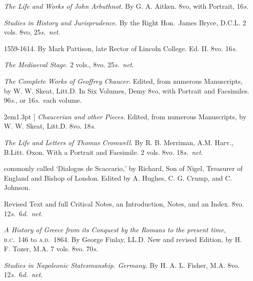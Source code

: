 \documentclass[12pt,oneside]{book}[2021/10/04]
\newcommand{\longdash}{\rule[.5ex]{2em}{1.3pt}
}
\newenvironment{advlist}{
  \begin{description}[leftmargin=1em, parsep=0.2ex, listparindent=1em,]
}{\end{description}}
\newcommand{\¬}{\hphantom{0}}
\begin{document}
\begin{advlist}
\item[Arbuthnot.] \textit{The Life and
Works of John Arbuthnot.} By G. A.
Aitken. 8vo, with Portrait, 16\textit{s.}

\item[Bryce.] \textit{Studies in History
and Jurisprudence.} By the Right
Hon.\ James Bryce, D.C.L. 2 vols.
8vo, 25\textit{s.}\ \textit{net}.

\item[Casaubon (Isaac),] 1559-1614.
By Mark Pattison, late Rector of
Lincoln College. Ed. II. 8vo. 16\textit{s.}

\item[Chambers.] \textit{The Mediaeval
Stage.} 2 vols., 8vo. 25\textit{s.}\ \textit{net}.

\item[Chaucer.] \textit{The Complete Works
of Geoffrey Chaucer.} Edited, from
numerous Manuscripts, by W. W.
Skeat, Litt.D. In Six Volumes,
Demy 8vo, with Portrait and Facsimiles.
96\textit{s.}, or 16\textit{s.}\ each volume.

\item[\longdash] \textit{Chaucerian and other
Pieces.} Edited, from numerous
Manuscripts, by W. W. Skeat,
Litt.D. 8vo. 18\textit{s.}

\item[Cromwell.] \textit{The Life and
Letters of Thomas Cromwell.} By R. B.
Merriman, A.M. Harv., B.Litt.
Oxon. With a Portrait and Facsimile.
2 vols. 8vo. 18\textit{s.}\ \textit{net}.

\item[De Necessariis Observantiis
Scaccarii Dialogus:] commonly
called `Dialogus de Scaccario,' by
Richard, Son of Nigel, Treasurer of
England and Bishop of London.
Edited by A. Hughes, C. G. Crump,
and C. Johnson.

Revised Text and full Critical
Notes, an Introduction, Notes, and
an Index. 8vo. 12\textit{s.}\ 6\textit{d.}\ \textit{net}.

\item[Finlay.] \textit{A History of Greece
from its Conquest by the Romans to the
present time}, \textsc{b.c.}\ 146 to \textsc{a.d.}\ 1864.
By George Finlay, LL.D. New and
revised Edition, by H. F. Tozer,
M.A. 7 vols. 8vo. 70\textit{s.}

\item[Fisher.] \textit{Studies in Napoleonic
Statesmanship. Germany.} By H.
A. L. Fisher, M.A. 8vo. 12\textit{s.}\ 6\textit{d.}\ \textit{net}.


\end{advlist}
\end{document}
